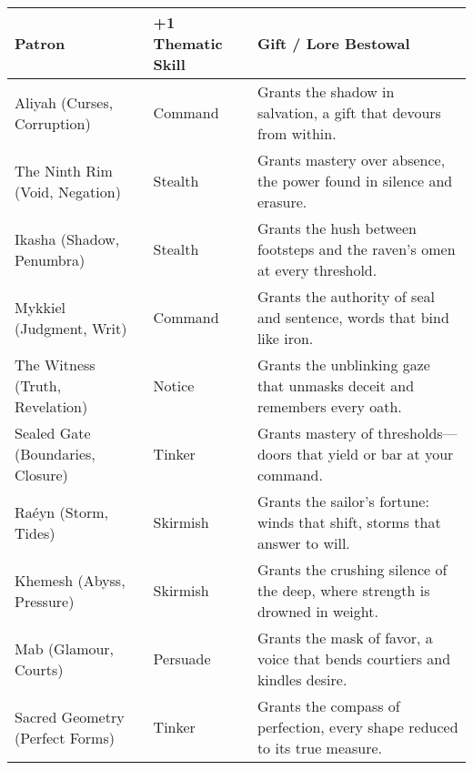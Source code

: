 \newcommand{\PatronGift}[2]{%
\paragraph{Patron's Gift (Imbuement).}
Once per scene as an action (cost: 1 Boon; requires \textbf{Thiasos}), touch an item to imbue it until scene end with \textbf{+1 Melee} and \textbf{+1 #1}. \emph{Push It:} extend one more scene by marking \textbf{+1 Obligation}. Gifts from the same Patron don’t stack; take the best. Dice bonuses respect the +3 cap. \textit{Domain:} #2.
}

\begin{table}[H]
  \centering
  \renewcommand{\arraystretch}{1.15}
  \begin{tabular}{@{}p{3.8cm}p{3.8cm}p{7.5cm}@{}}
  \toprule
  \textbf{Patron} & \textbf{+1 Thematic Skill} & \textbf{Gift / Lore Bestowal} \\
  \midrule
  Aliyah (Curses, Corruption) & Command & Grants the shadow in salvation, a gift that devours from within. \\
  The Ninth Rim (Void, Negation) & Stealth & Grants mastery over absence, the power found in silence and erasure. \\
  Ikasha (Shadow, Penumbra) & Stealth & Grants the hush between footsteps and the raven's omen at every threshold. \\
  Mykkiel (Judgment, Writ) & Command & Grants the authority of seal and sentence, words that bind like iron. \\
  The Witness (Truth, Revelation) & Notice & Grants the unblinking gaze that unmasks deceit and remembers every oath. \\
  Sealed Gate (Boundaries, Closure) & Tinker & Grants mastery of thresholds—doors that yield or bar at your command. \\
  Raéyn (Storm, Tides) & Skirmish & Grants the sailor's fortune: winds that shift, storms that answer to will. \\
  Khemesh (Abyss, Pressure) & Skirmish & Grants the crushing silence of the deep, where strength is drowned in weight. \\
  Mab (Glamour, Courts) & Persuade & Grants the mask of favor, a voice that bends courtiers and kindles desire. \\
  Sacred Geometry (Perfect Forms) & Tinker & Grants the compass of perfection, every shape reduced to its true measure. \\

\end{tabular}
\end{table}
